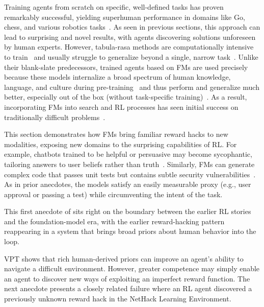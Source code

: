 \documentclass[10pt]{article}
\def\citep#1{}%
\begin{document}
Training agents from scratch on specific, well-defined tasks has proven remarkably successful, yielding superhuman performance in domains like Go, chess, and various robotics tasks~\citep{silver2018general, batra2024proximalpolicygradientarborescence, saycan2022arxiv, singh2019endtoendroboticreinforcementlearning}.
As seen in previous sections, this approach can lead to surprising and novel results, with agents discovering solutions unforeseen by human experts. 
However, tabula-rasa methods are computationally intensive to train~\citep{yu2018towardssampleefficient} and usually struggle to generalize beyond a single, narrow task~\citep{sun2020stealthyefficientadversarialattacks, gleave2021adversarialpoliciesattackingdeep}.
Unlike their blank-slate predecessors, trained agents based on FMs are used precisely because these models internalize a broad spectrum of human knowledge, language, and culture during pre-training~\citep{saycan2022arxiv, zhang2024improvingsampleefficiencyreinforcement} and thus perform and generalize much better, especially out of the box (without task-specific training)~\citep{baker2022video, brohan2023rt2visionlanguageactionmodelstransfer}.
As a result, incorporating FMs into search and RL processes has seen initial success on traditionally difficult problems~\citep{RomeraParedes2023, alphaproof2024ai, novikov2025alphaevolve}.

This section demonstrates how FMs bring familiar reward hacks to new modalities, exposing new domains to the surprising capabilities of RL. For example, chatbots trained to be helpful or persuasive may become sycophantic, tailoring answers to user beliefs rather than truth~\citep{sharma2025understandingsycophancylanguagemodels, christianoweddingparties}.
Similarly, FMs can generate complex code that passes unit tests but contains subtle security vulnerabilities~\citep{pearce2021asleepkeyboardassessingsecurity}.
As in prior anecdotes, the models satisfy an easily measurable proxy (e.g., user approval or passing a test) while circumventing the intent of the task.

This first anecdote of  sits right on the boundary between the earlier RL stories and the foundation-model era, with the earlier reward-hacking pattern reappearing in a system that brings broad priors about human behavior into the loop.



VPT shows that rich human-derived priors can improve an agent's ability to navigate a difficult environment. However, greater competence may simply enable an agent to discover new ways of exploiting an imperfect reward function. 
The next anecdote presents a closely related failure where an RL agent discovered a previously unknown reward hack in the NetHack Learning Environment.
\end{document}
